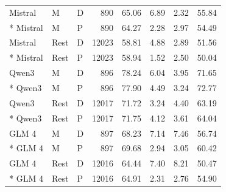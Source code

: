 {\begin{longtable}{lllrrrrr}
Mistral & M & D & 890 & 65.06 & 6.89 & 2.32 & 55.84\\*
Mistral & M & P & 890 & 64.27 & 2.28 & 2.97 & 54.49\\
Mistral & Rest & D & 12023 & 58.81 & 4.88 & 2.89 & 51.56\\*
Mistral & Rest & P & 12023 & 58.94 & 1.52 & 2.50 & 50.04\\
Qwen3 & M & D & 896 & 78.24 & 6.04 & 3.95 & 71.65\\*
Qwen3 & M & P & 896 & 77.90 & 4.49 & 3.24 & 72.77\\
Qwen3 & Rest & D & 12017 & 71.72 & 3.24 & 4.40 & 63.19\\*
Qwen3 & Rest & P & 12017 & 71.75 & 4.12 & 3.61 & 64.04\\
GLM 4 & M & D & 897 & 68.23 & 7.14 & 7.46 & 56.74\\*
GLM 4 & M & P & 897 & 69.68 & 2.94 & 3.05 & 60.42\\
GLM 4 & Rest & D & 12016 & 64.44 & 7.40 & 8.21 & 50.47\\*
GLM 4 & Rest & P & 12016 & 64.91 & 2.31 & 2.76 & 54.90\\
\end{longtable}}


